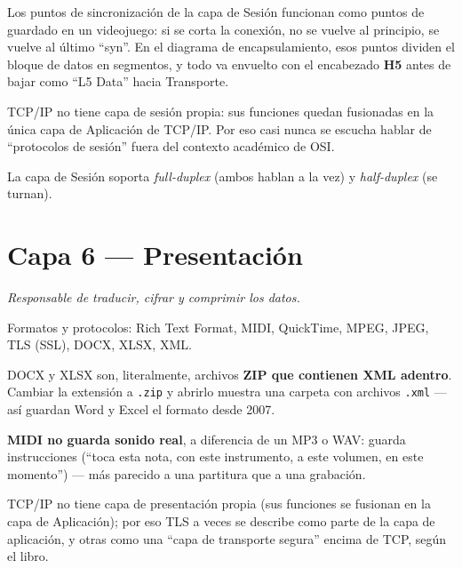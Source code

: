 \documentclass[11pt,a4paper]{article}
\begin{document}
Los puntos de sincronización de la capa de Sesión funcionan como puntos de guardado en un videojuego: si se corta la conexión, no se vuelve al principio, se vuelve al último ``syn''. En el diagrama de encapsulamiento, esos puntos dividen el bloque de datos en segmentos, y todo va envuelto con el encabezado \textbf{H5} antes de bajar como ``L5 Data'' hacia Transporte.

\begin{examfact}
TCP/IP no tiene capa de sesión propia: sus funciones quedan fusionadas en la única capa de Aplicación de TCP/IP. Por eso casi nunca se escucha hablar de ``protocolos de sesión'' fuera del contexto académico de OSI.
\end{examfact}

\begin{examfact}
La capa de Sesión soporta \textit{full-duplex} (ambos hablan a la vez) y \textit{half-duplex} (se turnan).
\end{examfact}

\newpage
\section{Capa 6 --- Presentación}
\textit{Responsable de traducir, cifrar y comprimir los datos.}

Formatos y protocolos: Rich Text Format, MIDI, QuickTime, MPEG, JPEG, TLS (SSL), DOCX, XLSX, XML.

\begin{examfact}
DOCX y XLSX son, literalmente, archivos \textbf{ZIP que contienen XML adentro}. Cambiar la extensión a \texttt{.zip} y abrirlo muestra una carpeta con archivos \texttt{.xml} --- así guardan Word y Excel el formato desde 2007.
\end{examfact}

\begin{examfact}
\textbf{MIDI no guarda sonido real}, a diferencia de un MP3 o WAV: guarda instrucciones (``toca esta nota, con este instrumento, a este volumen, en este momento'') --- más parecido a una partitura que a una grabación.
\end{examfact}

TCP/IP no tiene capa de presentación propia (sus funciones se fusionan en la capa de Aplicación); por eso TLS a veces se describe como parte de la capa de aplicación, y otras como una ``capa de transporte segura'' encima de TCP, según el libro.
\end{document}
